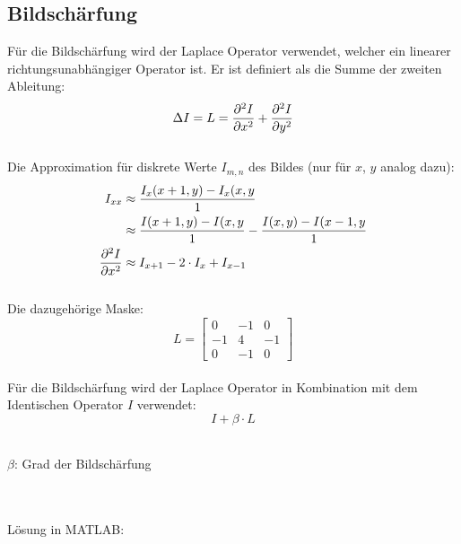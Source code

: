 \subsection{Bildschärfung}
Für die Bildschärfung wird der Laplace Operator verwendet, welcher ein linearer richtungsunabhängiger Operator ist.
Er ist definiert als die Summe der zweiten Ableitung:
\[
	\Delta I = L = \frac{\partial ^2 I}{\partial x^2} + \frac{\partial ^2 I}{\partial y^2}
\]
~\\
Die Approximation für diskrete Werte $I_{m,n}$ des Bildes (nur für $x$, $y$ analog dazu):
\[\begin{aligned}
	I_{xx} &\approx \frac{I_x(x+1,y)-I_x(x,y}{1} \\
	&\approx \frac{I(x+1,y)-I(x,y}{1} - \frac{I(x,y)-I(x-1,y}{1}\\
	\frac{\partial ^2 I}{\partial x^2} &\approx I_{x+1} - 2 \cdot I_x + I_{x-1}
\end{aligned}\]
~\\
Die dazugehörige Maske:
\[
	L = \left[ \begin{matrix}
	0 & -1 & 0\\
	-1 & 4 & -1\\
	0 & -1 & 0
	\end{matrix} \right]
\]
~\\
Für die Bildschärfung wird der Laplace Operator in Kombination mit dem Identischen Operator $I$ verwendet:
\[
	I + \beta \cdot L
\]
~\\
\begin{footnotesize}
$\beta$: Grad der Bildschärfung
\end{footnotesize}
\\\\
Lösung in MATLAB:
\lstset{language=Matlab}

~\\